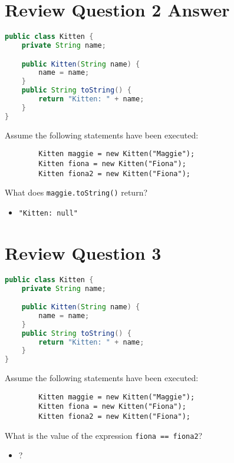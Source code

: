 \documentclass{article}
\begin{document}
\section{Review Question 2 Answer}

\begin{lstlisting}[language=Java]
public class Kitten {
    private String name;

    public Kitten(String name) {
        name = name;
    }
    public String toString() {
        return "Kitten: " + name;
    }
}
\end{lstlisting}

Assume the following statements have been executed:

\begin{lstlisting}
        Kitten maggie = new Kitten("Maggie");
        Kitten fiona = new Kitten("Fiona");
        Kitten fiona2 = new Kitten("Fiona");
\end{lstlisting}

What does {\tt maggie.toString()} return?
\begin{itemize}
\itemsep0em
\item {\tt "Kitten: null"}
\end{itemize}




\section{Review Question 3}

\begin{lstlisting}[language=Java]
public class Kitten {
    private String name;

    public Kitten(String name) {
        name = name;
    }
    public String toString() {
        return "Kitten: " + name;
    }
}
\end{lstlisting}

Assume the following statements have been executed:

\begin{lstlisting}
        Kitten maggie = new Kitten("Maggie");
        Kitten fiona = new Kitten("Fiona");
        Kitten fiona2 = new Kitten("Fiona");
\end{lstlisting}

What is the value of the expression {\tt fiona == fiona2}?
\begin{itemize}
\itemsep0em
\item ?
\end{itemize}
\end{document}
